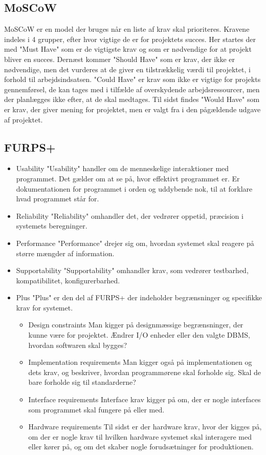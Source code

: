 \subsection{MoSCoW}
MoSCoW er en model der bruges når en liste af krav skal prioriteres. Kravene indeles i 4 grupper, efter hvor vigtige de er for projektets succes. Her startes der med "Must Have" som er de vigtigste krav og som er nødvendige for at projekt bliver en succes. Dernæst kommer "Should Have" som er krav, der ikke er nødvendige, men det vurderes at de giver en tilstrækkelig værdi til projektet, i forhold til arbejdsindsatsen. "Could Have" er krav som ikke er vigtige for projekts gennemførsel, de kan tages med i tilfælde af overskydende arbejdsressourcer, men der planlægges ikke efter, at de skal medtages. Til sidst findes "Would Have" som er krav, der giver mening for projektet, men er valgt fra i den pågældende udgave af projektet. 

\subsection{FURPS+}

\begin{itemize}
    \setlength\itemsep{0em}
    \item Usability
    \subitem "Usability" handler om de menneskelige interaktioner med programmet. Det gælder om at se på, hvor effektivt programmet er. Er dokumentationen for programmet i orden og uddybende nok, til at forklare hvad programmet står for.
    \item Reliability
    \subitem "Reliability" omhandler det, der vedrører oppetid, præcision i systemets beregninger.
    \item Performance
    \subitem "Performance" drejer sig om, hvordan systemet skal reagere på større mængder af information.
    \item Supportability
    \subitem "Supportability" omhandler krav, som vedrører testbarhed, kompatibilitet, konfigurerbarhed.
    \item Plus
    \subitem "Plus" er den del af FURPS+ der indeholder begrænsninger og specifikke krav for systemet.
    \begin{itemize}
        \item Design constraints
        \subitem Man kigger på designmæssige begrænsninger, der kunne være for projektet. Ændrer I/O enheder eller den valgte DBMS, hvordan softwaren skal bygges?
        \item Implementation requirements
        \subitem Man kigger også på implementationen og dets krav, og beskriver, hvordan programmørene skal forholde sig. Skal de bare forholde sig til standarderne?
        \item Interface requirements
        \subitem Interface krav kigger på om, der er nogle interfaces som programmet skal fungere på eller med.
        \item Hardware requirements
        \subitem Til sidst er der hardware krav, hvor der kigges på, om der er nogle krav til hvilken hardware systemet skal interagere med eller kører på, og om det skaber nogle forudsætninger for produktionen. 
    \end{itemize}
\end{itemize}
